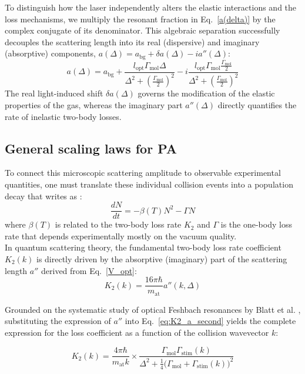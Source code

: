 To distinguish how the laser independently alters the elastic interactions and the loss mechanisms, we multiply the resonant fraction in Eq.~\ref{a(delta)} by the complex conjugate of its denominator. This algebraic
 separation successfully decouples the scattering length into its real (dispersive) and imaginary (absorptive) components, $a(\Delta) = a_{\text{bg}} + \delta a(\Delta) - i a''(\Delta)$:
\begin{equation}
    a(\Delta) = a_{\text{bg}} + \frac{l_{\text{opt}}\Gamma_{\text{mol}}\Delta}{\Delta^2 + \left(\frac{\Gamma_{\text{mol}}}{2}\right)^2} - i \frac{l_{\text{opt}}\Gamma_{\text{mol}}\frac{\Gamma_{\text{mol}}}{2}}
    {\Delta^2 + \left(\frac{ \Gamma_{\text{mol}}}{2}\right)^2}
\end{equation}
The real light-induced shift $\delta a(\Delta)$ governs the modification of the elastic properties of the gas, whereas the imaginary part $a''(\Delta)$ directly quantifies the rate of inelastic two-body losses.
\subsection{General scaling laws for PA}
To connect this microscopic scattering amplitude to observable experimental quantities, one must translate these individual collision events into a population decay that writes as 
\cite{martinez_de_escobar_two-photon_2008}:
\begin{equation}
    \frac{dN}{dt} = -\beta(T) N^2 - \Gamma N
\end{equation}
where $\beta(T)$ is related to the two-body loss rate $K_2$ and $\Gamma$ is the one-body loss rate that depends experimentally mostly on the vacuum quality.\\

In quantum scattering theory, the fundamental two-body loss rate coefficient $K_2(k)$ is directly driven by the absorptive (imaginary) part of the scattering length $a''$ derived from Eq.~\ref{V_opt}:
\begin{equation}
    K_2(k) = \frac{16\pi\hbar}{m_{\text{at}}} a''(k, \Delta)
    \label{eq:K2_a_second}
\end{equation}

Grounded on the systematic study of optical Feshbach resonances by Blatt et al. \cite{blatt_systematic_2011}, substituting the expression of $a''$ into Eq.~\ref{eq:K2_a_second} yields the complete expression for 
the loss coefficient as a function of the collision wavevector $k$:

\begin{equation}
    K_2(k) = \frac{4\pi \hbar}{m_{\text{at}} k} \times \frac{\Gamma_{\text{mol}} \Gamma_{\text{stim}}(k)}{\Delta^2 + \frac{1}{4}\big(\Gamma_{\text{mol}} + \Gamma_{\text{stim}}(k)\big)^2}
    \label{K2 complet Blatt}
\end{equation}


